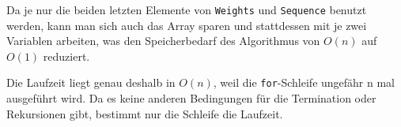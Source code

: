 \documentclass{article}
\begin{document}
Da je nur die beiden letzten Elemente von \texttt{Weights} und \texttt{Sequence}
benutzt werden, kann man sich auch das Array sparen und stattdessen mit je zwei
Variablen arbeiten, was den Speicherbedarf des Algorithmus von \(O(n)\) auf
\(O(1)\) reduziert.

Die Laufzeit liegt genau deshalb in \(O(n)\), weil die \texttt{for}-Schleife
ungefähr n mal ausgeführt wird. Da es keine anderen Bedingungen für die
Termination oder Rekursionen gibt, bestimmt nur die Schleife die Laufzeit.
\end{document}
